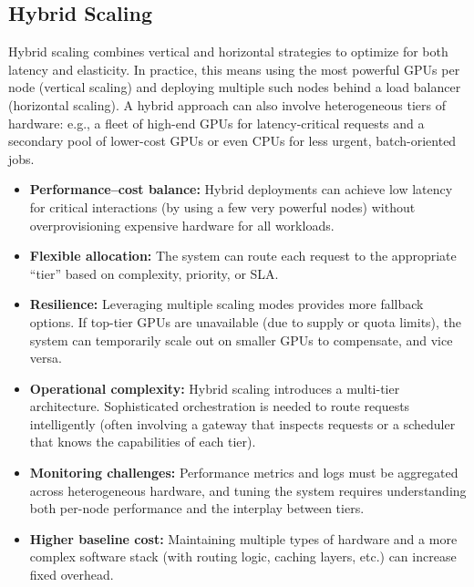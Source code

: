 \subsection{Hybrid Scaling}
\label{sec:scaling-hybrid}
Hybrid scaling combines vertical and horizontal strategies to optimize for both latency and elasticity. In practice, this means using the most powerful GPUs per node (vertical scaling) and deploying multiple such nodes behind a load balancer (horizontal scaling). A hybrid approach can also involve heterogeneous tiers of hardware: e.g., a fleet of high-end GPUs for latency-critical requests and a secondary pool of lower-cost GPUs or even CPUs for less urgent, batch-oriented jobs.

\begin{tcolorbox}[
  title={\textbf{Hybrid Scaling: Pros}},
  colback=green!5,
  colframe=green!40!black,
  colbacktitle=green!20,
  coltitle=black,
  fonttitle=\bfseries,
  boxrule=0.7pt,
  arc=4pt,
  left=5mm, right=5mm, top=4mm, bottom=4mm,
  before skip=6pt,
  after skip=6pt
]
\begin{itemize}[leftmargin=1.5em, itemsep=3pt]
    \item \textbf{Performance--cost balance:} Hybrid deployments can achieve low latency for critical interactions (by using a few very powerful nodes) without overprovisioning expensive hardware for all workloads.
    \item \textbf{Flexible allocation:} The system can route each request to the appropriate ``tier'' based on complexity, priority, or SLA.
    \item \textbf{Resilience:} Leveraging multiple scaling modes provides more fallback options. If top-tier GPUs are unavailable (due to supply or quota limits), the system can temporarily scale out on smaller GPUs to compensate, and vice versa.
\end{itemize}
\end{tcolorbox}

\begin{tcolorbox}[
  title={\textbf{Hybrid Scaling: Cons}},
  colback=red!5,
  colframe=red!40!black,
  colbacktitle=red!20,
  coltitle=black,
  fonttitle=\bfseries,
  boxrule=0.7pt,
  arc=4pt,
  left=5mm, right=5mm, top=4mm, bottom=4mm,
  before skip=6pt,
  after skip=6pt
]
\begin{itemize}[leftmargin=1.5em, itemsep=3pt]
    \item \textbf{Operational complexity:} Hybrid scaling introduces a multi-tier architecture. Sophisticated orchestration is needed to route requests intelligently (often involving a gateway that inspects requests or a scheduler that knows the capabilities of each tier).
    \item \textbf{Monitoring challenges:} Performance metrics and logs must be aggregated across heterogeneous hardware, and tuning the system requires understanding both per-node performance and the interplay between tiers.
    \item \textbf{Higher baseline cost:} Maintaining multiple types of hardware and a more complex software stack (with routing logic, caching layers, etc.) can increase fixed overhead.
\end{itemize}
\end{tcolorbox}

